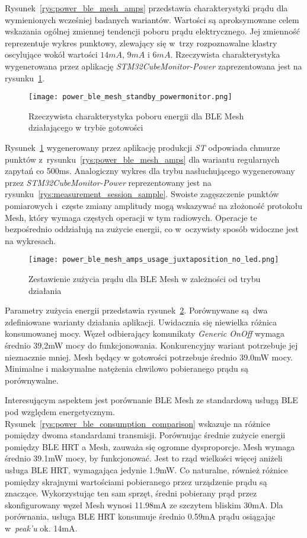Rysunek~\ref{rys:power_ble_mesh_amps} przedstawia charakterystyki prądu dla wymienionych wcześniej badanych wariantów. Wartości są aproksymowane
celem wskazania ogólnej zmiennej tendencji poboru prądu elektrycznego. Jej zmienność reprezentuje wykres punktowy, zlewający się 
w~trzy rozpoznawalne klastry oscylujące wokół wartości $14mA$, $9mA$ i $6mA$. Rzeczywista charakterystyka wygenerowana przez
aplikację \textit{STM32CubeMonitor-Power} zaprezentowana jest na rysunku~\ref{rys:power_ble_mesh_standby_powermonitor}.

\begin{figure}[!ht]
	\centering \texttt{[image: power\_ble\_mesh\_standby\_powermonitor.png]} 
	\caption{Rzeczywista charakterystyka poboru energii dla BLE Mesh działającego w trybie gotowości}
	\label{rys:power_ble_mesh_standby_powermonitor}
\end{figure}

Rysunek~\ref{rys:power_ble_mesh_standby_powermonitor} wygenerowany przez aplikację produkcji \textit{ST} odpowiada chmurze punktów
z~rysunku~\ref{rys:power_ble_mesh_amps} dla wariantu regularnych zapytań co 500ms. Analogiczny wykres dla
trybu nasłuchującego wygenerowany przez \textit{STM32CubeMonitor-Power} reprezentowany jest na rysunku~\ref{rys:measurement_session_sample}.
Swoiste zagęszczenie punktów pomiarowych i~częste zmiany amplitudy mogą wskazywać na złożoność protokołu Mesh,
który wymaga częstych operacji w tym radiowych. Operacje te bezpośrednio oddziałują na zużycie energii, co w~oczywisty
sposób widoczne jest na wykresach.


\begin{figure}[!ht]
	\centering \texttt{[image: power\_ble\_mesh\_amps\_usage\_juxtaposition\_no\_led.png]} 
	\caption{Zestawienie zużycia prądu dla BLE Mesh w zależności od trybu działania}
	\label{rys:power_ble_mesh_amps_usage_juxtaposition}
\end{figure}

Parametry zużycia energii przedstawia rysunek~\ref{rys:power_ble_mesh_amps_usage_juxtaposition}. Porównywane są dwa zdefiniowane
warianty działania aplikacji. Uwidacznia się niewielka różnica konsumowanej mocy. Węzeł odbierający komunikaty \textit{Generic OnOff}
wymaga średnio 39,2mW mocy do funkcjonowania. Konkurencyjny wariant potrzebuje jej nieznacznie mniej. Mesh będący w gotowości
potrzebuje średnio 39.0mW mocy. Minimalne i maksymalne natężenia chwilowo pobieranego prądu są porównywalne.

Interesującym aspektem jest porównanie BLE Mesh ze standardową usługą BLE pod względem energetycznym. Rysunek~\ref{rys:power_ble_consumption_comparison}
wskazuje na różnice pomiędzy dwoma standardami transmisji. Porównując średnie zużycie energii pomiędzy BLE HRT a Mesh, zauważa 
się ogromne dysproporcje. Mesh wymaga średnio 39.1mW mocy, by funkcjonować. Jest to rząd wielkości więcej aniżeli
usługa BLE HRT, wymagająca jedynie 1.9mW. Co naturalne, również różnice pomiędzy skrajnymi wartościami pobieranego
przez urządzenie prądu są znaczące. Wykorzystując ten sam sprzęt, średni pobierany prąd przez skonfigurowany węzeł Mesh
wynosi 11.98mA ze szczytem bliskim 30mA. Dla porównania, usługa BLE HRT konsumuje średnio 0.59mA prądu osiągając
w~\textit{peak'u} ok. 14mA.


